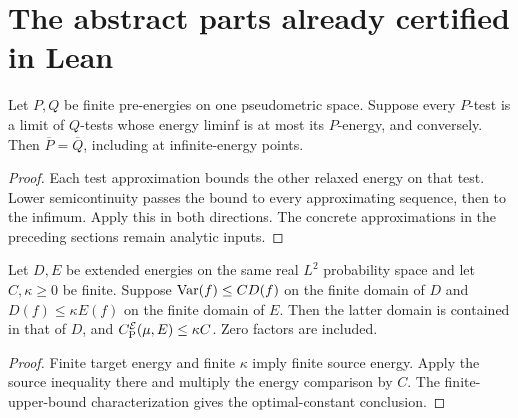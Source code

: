 \section{The abstract parts already certified in Lean}

\begin{lemma}
  \label{lem:mutual-test-approximation-relaxation}
  \leanok
  Let $P,Q$ be finite pre-energies on one pseudometric space. Suppose every $P$-test is a
  limit of $Q$-tests whose energy liminf is at most its $P$-energy, and conversely.
  Then $\overline P=\overline Q$, including at infinite-energy points.
\end{lemma}
\begin{proof}
  \leanok
  Each test approximation bounds the other relaxed energy on that test. Lower semicontinuity
  passes the bound to every approximating sequence, then to the infimum. Apply this in both
  directions. The concrete approximations in the preceding sections remain analytic inputs.
\end{proof}

\begin{lemma}
  \label{lem:finite-energy-factor-poincare}
  \leanok
  Let $D,E$ be extended energies on the same real $L^2$ probability space and let
  $C,\kappa\ge0$ be finite. Suppose $\operatorname{Var}(f)\le C D(f)$ on the finite domain of $D$ and
  $D(f)\le\kappa E(f)$ on the finite domain of $E$. Then the latter domain is contained
  in that of $D$, and $C_{\mathrm P}^{\mathcal E}(\mu,E)\le\kappa C$. Zero factors are included.
\end{lemma}
\begin{proof}
  \leanok
  Finite target energy and finite $\kappa$ imply finite source energy. Apply the source
  inequality there and multiply the energy comparison by $C$. The finite-upper-bound
  characterization gives the optimal-constant conclusion.
\end{proof}
